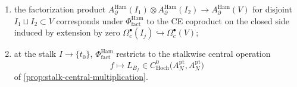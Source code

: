 \documentclass[11pt]{memoir}
\begin{document}
\begin{thm}
\begin{enumerate}
      topological direction $\R$ in the sense of Lurie,
      \emph{Higher Algebra}, \S 5.5; Costello--Gwilliam
      \cite{costello-gwilliam}*{Vol.~I \S 6.4} gives the published
      factorization-algebra terminology.  Extension by zero
      \(\mathcal D'_c(I')\to\mathcal D'_c(I)\) for arbitrary compactly
      supported distributional currents is governed by a separate
      wave-front extension datum;
    \item the factorization product
      $A_\partial^{\mathrm{Ham}}(I_1)\otimes A_\partial^{\mathrm{Ham}}(I_2)
        \to A_\partial^{\mathrm{Ham}}(V)$ for disjoint
      $I_1\sqcup I_2\subset V$ corresponds under
      $\Phi^{\mathrm{Ham}}_{\mathrm{fact}}$ to the CE coproduct on the
      closed side induced by extension by zero
      $\Omega_c^\bullet(I_j)\hookrightarrow\Omega_c^\bullet(V)$;
    \item at the stalk $I\to\{t_0\}$,
      $\Phi^{\mathrm{Ham}}_{\mathrm{fact}}$ restricts to the stalkwise
      central operation
      $$f\longmapsto L_{B_f}\in
      C^0_{\mathrm{Hoch}}\bigl(A_N^{\mathrm{pt}},
      A_N^{\mathrm{pt}}\bigr)$$
      of \ref{prop:stalk-central-multiplication}.
  \end{enumerate}
\end{thm}
\end{document}
